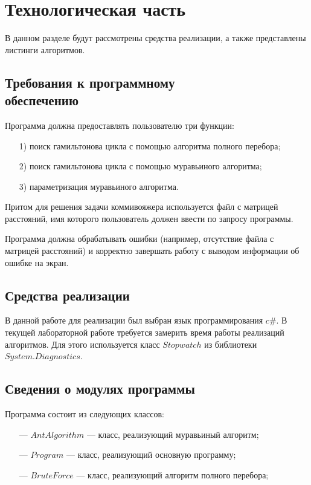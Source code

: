 \chapter{Технологическая часть}
В данном разделе будут рассмотрены средства реализации, а также представлены листинги алгоритмов.
\section[Требования к программному обеспечению]{Требования к программному\\обеспечению }

Программа должна предоставлять пользователю три функции:
\begin{enumerate}[itemindent=1em]
	\item[1)] поиск гамильтонова цикла с помощью алгоритма полного перебора;
	\item[2)] поиск гамильтонова цикла с помощью муравьиного алгоритма;
	\item[3)] параметризация муравьиного алгоритма.
\end{enumerate}

Притом для решения задачи коммивояжера используется файл с матрицей расстояний, имя которого пользователь должен ввести по запросу программы.

Программа должна обрабатывать ошибки (например, отсутствие файла с матрицей расстояний) и корректно завершать работу с выводом информации об ошибке на экран.

\section{Средства реализации}
В данной работе для реализации был выбран язык программирования $c\#$. В текущей лабораторной работе требуется замерить время работы реализаций алгоритмов. Для этого используется класс  $Stopwatch$ из библиотеки $System.Diagnostics$.
\newpage
\section{Сведения о модулях программы}
Программа состоит из следующих классов:
\begin{itemize}[itemindent=1.25em]
	\item[---] $AntAlgorithm$ --- класс, реализующий муравьиный алгоритм; 
	\item[---] $Program$ --- класс, реализующий основную программу;
    \item[---] $BruteForce$ --- класс, реализующий алгоритм полного перебора;
\end{itemize}

